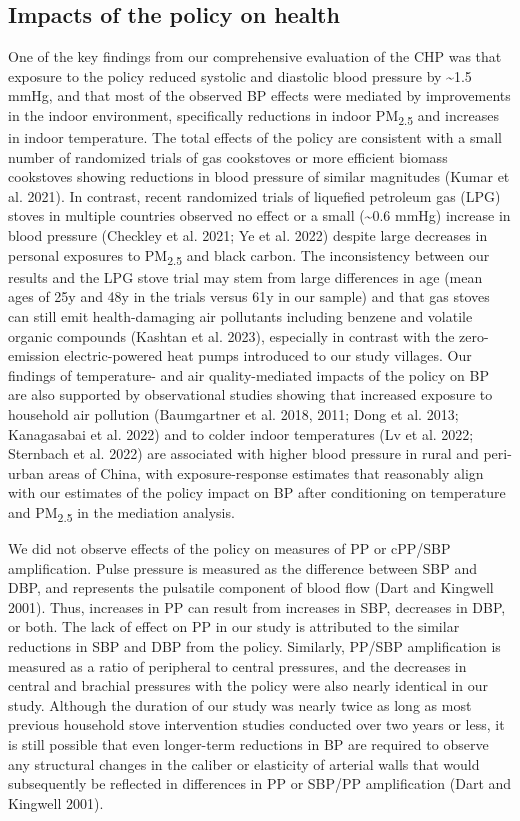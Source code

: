 \documentclass[
  letterpaper,
  DIV=11,
  numbers=noendperiod]{scrartcl}
\begin{document}
\subsection{Impacts of the policy on
health}\label{impacts-of-the-policy-on-health}

One of the key findings from our comprehensive evaluation of the CHP was
that exposure to the policy reduced systolic and diastolic blood
pressure by \textasciitilde1.5 mmHg, and that most of the observed BP
effects were mediated by improvements in the indoor environment,
specifically reductions in indoor PM\textsubscript{2.5} and increases in
indoor temperature. The total effects of the policy are consistent with
a small number of randomized trials of gas cookstoves or more efficient
biomass cookstoves showing reductions in blood pressure of similar
magnitudes (Kumar et al. 2021). In contrast, recent randomized trials of
liquefied petroleum gas (LPG) stoves in multiple countries observed no
effect or a small (\textasciitilde0.6 mmHg) increase in blood pressure
(Checkley et al. 2021; Ye et al. 2022) despite large decreases in
personal exposures to PM\textsubscript{2.5} and black carbon. The
inconsistency between our results and the LPG stove trial may stem from
large differences in age (mean ages of 25y and 48y in the trials versus
61y in our sample) and that gas stoves can still emit health-damaging
air pollutants including benzene and volatile organic compounds (Kashtan
et al. 2023), especially in contrast with the zero-emission
electric-powered heat pumps introduced to our study villages. Our
findings of temperature- and air quality-mediated impacts of the policy
on BP are also supported by observational studies showing that increased
exposure to household air pollution (Baumgartner et al. 2018, 2011; Dong
et al. 2013; Kanagasabai et al. 2022) and to colder indoor temperatures
(Lv et al. 2022; Sternbach et al. 2022) are associated with higher blood
pressure in rural and peri-urban areas of China, with exposure-response
estimates that reasonably align with our estimates of the policy impact
on BP after conditioning on temperature and PM\textsubscript{2.5} in the
mediation analysis.

We did not observe effects of the policy on measures of PP or cPP/SBP
amplification. Pulse pressure is measured as the difference between SBP
and DBP, and represents the pulsatile component of blood flow (Dart and
Kingwell 2001). Thus, increases in PP can result from increases in SBP,
decreases in DBP, or both. The lack of effect on PP in our study is
attributed to the similar reductions in SBP and DBP from the policy.
Similarly, PP/SBP amplification is measured as a ratio of peripheral to
central pressures, and the decreases in central and brachial pressures
with the policy were also nearly identical in our study. Although the
duration of our study was nearly twice as long as most previous
household stove intervention studies conducted over two years or less,
it is still possible that even longer-term reductions in BP are required
to observe any structural changes in the caliber or elasticity of
arterial walls that would subsequently be reflected in differences in PP
or SBP/PP amplification (Dart and Kingwell 2001).
\end{document}
